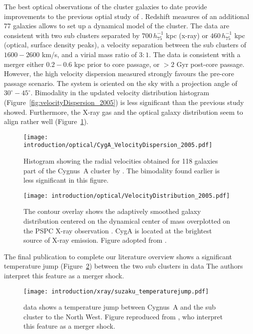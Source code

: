 \documentclass[MScProj_TLRH_ClusterEnergy.tex]{subfiles}
\begin{document}
The best optical observations of the cluster galaxies to date provide improvements to 
the previous optial study of \citet{1997ApJ...488L..15O}. Redshift measures of an additional
77 galaxies allows \citet{2005AJ....130...47L} to set up a dynamical model of the cluster.
The data are consistent with two sub clusters separated by \mytilde $700 \, h_{75}^{-1}$ kpc 
(x-ray) or \mytilde $460 \, h_{75}^{-1}$ kpc (optical, surface density peaks), a velocity 
separation between the sub clusters of $1600-2600$ km/s, and a virial mass ratio of $3:1$. 
The data is consistent with a merger either $0.2-0.6$ kpc prior to core passage, or 
$>2$ Gyr post-core passage. However, the high velocity dispersion measured strongly favours 
the pre-core passage scenario. The system is oriented on the sky with a projection angle of 
\mytilde $30^{\circ} - 45^{\circ}$. Bimodality in the updated velocity distribution histogram
(Figure~\ref{fig:velocityDispersion_2005}) is less significant than the previous study showed.
Furthermore, the X-ray gas and the optical galaxy distribution seem to align rather well 
(Figure~\ref{fig:velocityDistribution_2005}).

\begin{figure}
\centering
\texttt{[image: introduction/optical/CygA\_VelocityDispersion\_2005.pdf]}
\caption{Histogram showing the radial velocities obtained for 118 galaxies part of the 
         Cygnus~A cluster by \citet{2005AJ....130...47L}. The bimodality found earlier
         is less significant in this figure.}
         
\label{fig:velocityDispersion_2005}
\texttt{[image: introduction/optical/VelocityDistribution\_2005.pdf]}
\caption{The contour overlay shows the adaptively smoothed galaxy distribution
         centered on the dynamical center of mass overplotted on the 
         PSPC X-ray observation \citep{1996MNRAS.278..479R}. CygA is located at the
         brightest source of X-ray emission. Figure adopted from \cite{2005AJ....130...47L}.}
\label{fig:velocityDistribution_2005}
\end{figure}

The final publication to complete our literature overview shows a significant 
temperature jump (Figure~\ref{fig:Suzaku_MergerShock}) between the two sub 
clusters in  data \citep{2013AN....334..346S} The authors 
interpret this feature as a merger shock.

\begin{figure}
\centering
\texttt{[image: introduction/xray/suzaku\_temperaturejump.pdf]}
\caption{ data shows a temperature jump between Cygnus~A and the
         sub cluster to the North West. Figure reproduced from \citet{2013AN....334..346S},
         who interpret this feature as a merger shock.}
\label{fig:Suzaku_MergerShock}
\end{figure}

\SubfileBibliography
\end{document}
